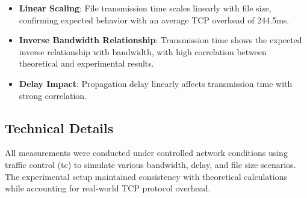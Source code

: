 \documentclass[11pt,letterpaper]{article}
\begin{document}
\begin{itemize}
    \item \textbf{Linear Scaling}:
    File transmission time scales linearly with file size,
    confirming expected behavior with an average TCP overhead of 244.5ms.
    
    \item \textbf{Inverse Bandwidth Relationship}:
    Transmission time shows the expected inverse relationship with bandwidth,
    with high correlation between theoretical and experimental results.

    \item \textbf{Delay Impact}:
    Propagation delay linearly affects transmission time with strong correlation.
    
\end{itemize}

\subsection{Technical Details}

All measurements were conducted under controlled network conditions using traffic control (tc) to simulate various bandwidth, delay, and file size scenarios. The experimental setup maintained consistency with theoretical calculations while accounting for real-world TCP protocol overhead.

\end{document}
